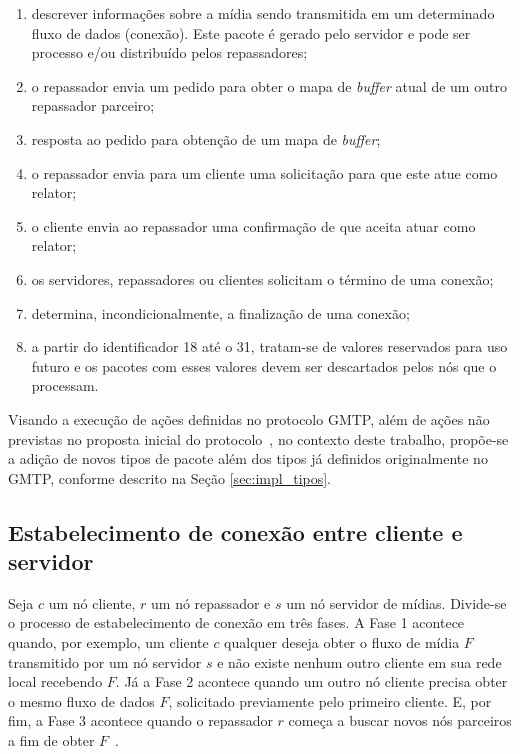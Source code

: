\begin{enumerate}
	\item {} descrever informações sobre a mídia sendo transmitida em um determinado fluxo de dados (conexão). Este pacote é gerado pelo servidor e pode ser processo e/ou distribuído pelos repassadores;
	
	\item {} o repassador envia um pedido para obter o mapa de \textit{buffer} atual de um outro repassador parceiro;
	
	\item {} resposta ao pedido para obtenção de um mapa de \textit{buffer};
	
	\item {} o repassador envia para um cliente uma solicitação para que este atue como relator;
	
	\item {} o cliente envia ao repassador uma confirmação de que aceita atuar como relator;
	
	\item {} os servidores, repassadores ou clientes solicitam o término de uma conexão;
	
	\item {} determina, incondicionalmente, a finalização de uma conexão;
	
	\item {} a partir do identificador 18 até o 31, tratam-se de valores reservados para uso futuro e os pacotes com esses valores devem ser descartados pelos nós que o processam.
	
\end{enumerate}

Visando a execução de ações definidas no protocolo GMTP, além de ações não previstas no proposta inicial do protocolo~\cite{sales2014gmtp}, no contexto deste trabalho, propõe-se a adição de novos tipos de pacote além dos tipos já definidos originalmente no GMTP, conforme descrito na Seção \ref{sec:impl_tipos}.

\subsection{Estabelecimento de conexão entre cliente e servidor}
\label{sec:conexao}

Seja $c$ um nó cliente, $r$ um nó repassador e $s$ um nó servidor de mídias.
Divide-se o processo de estabelecimento de conexão em três fases. 
A Fase 1 acontece quando, por exemplo, um cliente $c$ qualquer deseja obter o fluxo de mídia $F$ transmitido por um nó servidor $s$ e não existe nenhum outro cliente em sua rede local recebendo $F$. 
Já a Fase 2 acontece quando um outro nó cliente precisa obter o mesmo fluxo de dados $F$, solicitado previamente pelo primeiro cliente. E, por fim, a Fase 3 acontece quando o repassador $r$ começa a buscar novos nós parceiros a fim de obter $F$~\cite{sales2014gmtp}.

